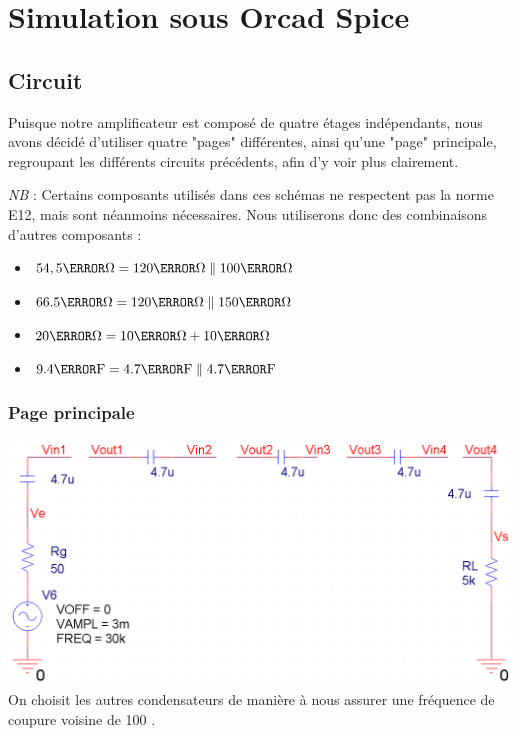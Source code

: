 \documentclass[11pt;a4paper]{report}
\begin{document}
 \chapter{Simulation sous Orcad Spice}
  \section{Circuit}
    Puisque notre amplificateur est composé de quatre étages indépendants, nous avons décidé d'utiliser quatre "pages"
    différentes, ainsi qu'une "page"  principale, regroupant les différents circuits précédents, afin d'y voir plus clairement.

    \emph{NB} : Certains composants utilisés dans ces schémas ne respectent pas la norme E12, mais sont néanmoins nécessaires.
    Nous utiliserons donc des combinaisons d'autres composants :
    \begin{itemize}
     \item $54,5 \kilo \ohm = 120 \kilo\ohm \parallel 100 \kilo\ohm$
     \item $66.5 \kilo \ohm = 120 \kilo\ohm \parallel 150 \kilo\ohm$
     \item $20 \kilo\ohm = 10 \kilo\ohm + 10 \kilo\ohm$
     \item $9.4 \micro \farad = 4.7 \micro\farad \parallel 4.7 \micro\farad$ 
    \end{itemize}

   \subsection{Page principale}
    \includegraphics[width=18cm]{images/circuit_main}
    On choisit les autres condensateurs de manière à nous assurer une fréquence de coupure voisine de 100 \hertz.
\end{document}
